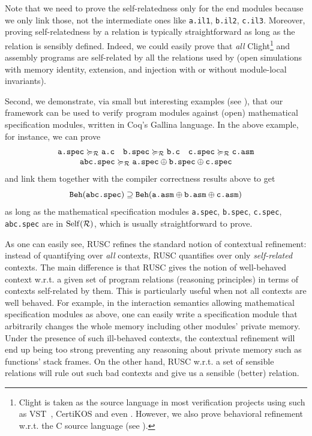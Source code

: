 Note that we need to prove the self-relatedness only for the end
modules because we only link those, not the intermediate ones
like \texttt{a.il1}, \texttt{b.il2}, \texttt{c.il3}.
Moreover, proving self-relatedness by a relation is typically
straightforward as long as the relation is sensibly defined.  Indeed,
we could easily prove that \emph{all} Clight\footnote{Clight is taken
  as the source language in most verification projects using \cc{}
  such as VST~\cite{VST}, CertiKOS and even \ccc{}.
  However, we also prove behavioral refinement w.r.t. the C source language
  (see ).
}
and assembly programs are
self-related by all the relations used by \ccm{}
(\ie open simulations with memory identity, extension,
and injection with or without module-local invariants).

Second, we demonstrate, via small but interesting examples (see ),
that our framework can be used to verify program modules
against (open) mathematical specification modules, written in Coq's Gallina language.
In the above example, for instance, we can prove
\[
\begin{array}{c}
\texttt{a.spec} \succcurlyeq_{\mathcal{R}} \texttt{a.c}\quad
\texttt{b.spec} \succcurlyeq_{\mathcal{R}} \texttt{b.c}\quad
\texttt{c.spec} \succcurlyeq_{\mathcal{R}} \texttt{c.asm}
\\
\texttt{abc.spec} \succcurlyeq_{\mathcal{R}} \texttt{a.spec} \oplus \texttt{b.spec} \oplus \texttt{c.spec}
\end{array}
\]
and link them together with the compiler correctness results above to get
\[
\beh{\texttt{abc.spec}}
\supseteq %
\beh{\texttt{a.asm} \llink \texttt{b.asm} \llink \texttt{c.asm}}
\]
as long as the mathematical specification modules \texttt{a.spec},
\texttt{b.spec}, \texttt{c.spec}, \texttt{abc.spec} are in $\mathrm{Self}(\mathcal{R})$,
which is usually straightforward to prove.

%
As one can easily see, RUSC refines the standard notion of contextual
refinement: instead of quantifying over \emph{all} contexts, RUSC
quantifies over only \emph{self-related} contexts. The main difference
is that RUSC gives the notion of well-behaved context w.r.t. a given
set of program relations (\ie reasoning principles) in terms of
contexts self-related by them.  This is particularly useful when not
all contexts are well behaved.  For example, in the interaction
semantics allowing mathematical specification modules as above, one can
easily write a specification module that arbitrarily changes the whole
memory including other modules' private memory. Under the presence of
such ill-behaved contexts, the contextual refinement will end up being too
strong preventing any reasoning about private memory such as
functions' stack frames. On the other hand, RUSC w.r.t. a set of
sensible relations will rule out such bad contexts and give us a sensible (better) relation.


